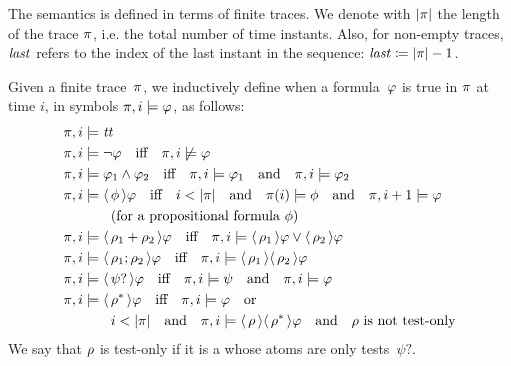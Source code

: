 The \ldl{} semantics is defined in terms of finite traces. We denote with
$\lvert\pi\rvert$ the length of the trace $\pi$, i.e. the total number of time
instants. Also, for non-empty traces, $\text{\textit{last}}$ refers to the index of the
last instant in the sequence: $\text{\textit{last}} \coloneqq \lvert\pi\rvert-1$.
\begin{definition}
	Given a finite trace~$\pi$, we inductively define when a \ldl{}
	formula~$\varphi$ is true in $\pi$ at time $i$, in symbols ${\pi, i
	\models \varphi}$, as follows:
	\begin{align*}
		\pi, i &\models \text{\textit{tt}} \\
		\pi, i &\models \neg \varphi \quad \text{iff} \quad
			\pi, i \not\models \varphi \\
		\pi, i &\models \varphi_1 \land \varphi_2 \quad \text{iff} \quad
			\pi, i \models \varphi_1 \quad \text{and} \quad
			\pi, i \models \varphi_2 \\
		\pi, i &\models \langle\, {\phi} \,\rangle \varphi \quad \text{iff} \quad
			i < \lvert\pi\rvert \quad \text{and} \quad \pi(i) \models \phi
			\quad \text{and} \quad \pi, i+1 \models \varphi \\
			& \qquad \text{(for a propositional formula~$\phi$)} \\
		\pi, i &\models \langle\, {\rho_1 + \rho_2} \,\rangle \varphi \quad \text{iff} \quad
			\pi, i \models \langle\, {\rho_1} \,\rangle \varphi \lor \langle\, {\rho_2} \,\rangle
			\varphi \\
		\pi, i &\models \langle\, {\rho_1 ; \rho_2} \,\rangle \varphi \quad \text{iff} \quad
			\pi, i \models \langle\, {\rho_1} \,\rangle \langle\, {\rho_2} \,\rangle \varphi \\
		\pi, i &\models \langle\, {\psi?} \,\rangle \varphi \quad \text{iff} \quad
			\pi, i \models \psi \quad \text{and} \quad
			\pi, i \models \varphi \\
		\pi, i &\models \langle\, {\rho^*} \,\rangle \varphi \quad \text{iff} \quad
			\pi, i \models \varphi \quad \text{or} \quad \\
			& \qquad i < \lvert\pi\rvert \quad \text{and} \quad \pi, i \models
			\langle\, {\rho} \,\rangle\langle\, {\rho^*} \,\rangle \varphi \quad \text{and} \quad
			\text{$\rho$ is not test-only}
	\end{align*}
	We say that $\rho$ is test-only if it is a \re{} whose atoms are only
	tests~$\psi?$.
	\label{def:ldlf-semanitcs}
\end{definition}


